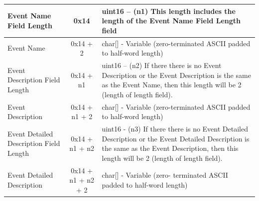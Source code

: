 \documentclass[14]{article}
\begin{document}
\begin{tabular}[l]{|p{5cm}|c|p{7cm}|}
  \hline
  Event Name Field Length & 0x14 & uint16 – (n1) This length includes the length
                                   of the Event Name Field Length field \\
  \hline
  Event Name & 0x14 + 2 & char[] - Variable (zero-terminated ASCII padded to
                          half-word length) \\
  \hline
  Event Description Field Length & 0x14 + n1 & uint16 – (n2) If there there is no
                                               Event Description or the Event
                                               Description is the same as the
                                               Event Name, then this length
                                               will be 2 (length of length
                                               field). \\
  \hline
  Event Description & 0x14 + n1 + 2 & char[] - Variable (zero-terminated ASCII
                                      padded to half-word length) \\
  \hline
  Event Detailed Description Field Length & 0x14 + n1 + n2 & uint16 - (n3) If
                                                             there there is no
                                                             Event Detailed
                                                             Description or the
                                                             Event Detailed
                                                             Description is the
                                                             same as the Event
                                                             Description, then
                                                             this length will be
                                                             2 (length of length
                                                             field). \\
  \hline
  Event Detailed Description & 0x14 + n1 + n2 + 2 & char[] - Variable (zero-
                                                    terminated ASCII padded to
                                                    half-word length) \\
  \hline
\end{tabular}
\end{document}
